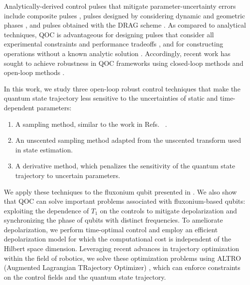 \documentclass[
  amsfonts,
  amsmath,
  amssymb,
  pra,
  twocolumn,
  superscriptaddress,
]{revtex4-2}
\begin{document}
Analytically-derived control pulses that mitigate parameter-uncertainty
errors include composite pulses \cite{cummins2000use, cummins2003tackling,
  kupce1995stretched, merrill2014progress},
pulses designed by considering dynamic and geometric phases
\cite{han2020experimental, xu2020nonadiabatic, dridi2020optimal}, and
pulses obtained with the DRAG scheme \cite{motzoi2009simple}.
As compared to analytical techniques, QOC is advantageous for
designing pulses that consider all experimental constraints and
performance tradeoffs
\cite{leung2017speedup},
and for constructing operations without a known analytic solution
\cite{chakram2020multimode, heeres2017implementing}.
Accordingly, recent work has sought to achieve robustness in QOC
frameworks using closed-loop methods
\cite{egger2014adaptive, feng2018gradient,
  li2017hybrid, wittler2020integrated, pechen2012trap}
and open-loop methods
\cite{ball2020software, carvalho2020error, allen2019robust, reinhold2019controlling,
  rembold2020introduction, kosut2013robust, niu2019universal, khaneja2005optimal}.

In this work, we study three open-loop robust control techniques that
make the quantum state trajectory less sensitive to the uncertainties
of static and time-dependent parameters:
\begin{enumerate}
\item A sampling method, similar to the work in Refs.~
  \cite{allen2019robust, khaneja2005optimal, reinhold2019controlling, rembold2020introduction}.
\item An unscented sampling method \cite{howell2020direct, lee2013sigma, thangavel2020robust}
  adapted from the unscented transform \cite{julier2004unscented,
    uhlmann1995dynamic} used in state estimation.
  \item A derivative method, which penalizes the sensitivity of the quantum state trajectory
    to uncertain parameters.
\end{enumerate}
We apply these techniques to the fluxonium qubit presented in \cite{zhang2020universal}.
We also show that QOC can solve important problems associated with
fluxonium-based qubits: exploiting the dependence of $T_{1}$ on the controls
to mitigate depolarization
and synchronizing the phase of qubits with distinct frequencies.
To ameliorate depolarization,
we perform time-optimal control and
employ an efficient depolarization model
for which the computational cost is independent of the
Hilbert space dimension.
Leveraging recent advances in trajectory optimization within the field of robotics, we
solve these optimization problems using ALTRO (Augmented Lagrangian TRajectory Optimizer)
\cite{howell2019altro}, which can enforce constraints on
the control fields and the quantum state trajectory.
\end{document}

